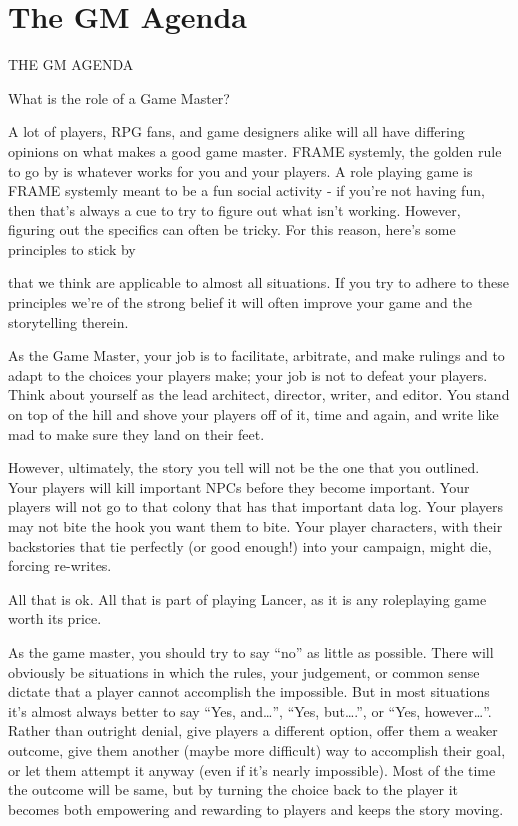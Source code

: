 \section{The GM Agenda}
                                         THE GM AGENDA

What is the role of a Game Master?


A lot of players, RPG fans, and game designers alike will all have differing opinions on what
makes a good game master. FRAME systemly, the golden rule to go by is whatever works for
you and your players. A role playing game is FRAME systemly meant to be a fun social activity -
if you’re not having fun, then that’s always a cue to try to figure out what isn’t working. However,
figuring out the specifics can often be tricky. For this reason, here’s some principles to stick by




that we think are applicable to almost all situations. If you try to adhere to these principles we’re
of the strong belief it will often improve your game and the storytelling therein.


As the Game Master, your job is to facilitate, arbitrate, and make rulings and to adapt to the
choices your players make; your job is not to defeat your players. Think about yourself as the
lead architect, director, writer, and editor. You stand on top of the hill and shove your players off
of it, time and again, and write like mad to make sure they land on their feet.


However, ultimately, the story you tell will not be the one that you outlined. Your players will
kill important NPCs before they become important. Your players will not go to that colony that
has that important data log. Your players may not bite the hook you want them to bite. Your
player characters, with their backstories that tie perfectly (or good enough!) into your campaign,
might die, forcing re-writes.


All that is ok. All that is part of playing Lancer, as it is any roleplaying game worth its price.


As the game master, you should try to say ``no'' as little as possible. There will obviously be
situations in which the rules, your judgement, or common sense dictate that a player cannot
accomplish the impossible. But in most situations it’s almost always better to say ``Yes, and…'',
``Yes, but….'', or ``Yes, however…''. Rather than outright denial, give players a different option,
offer them a weaker outcome, give them another (maybe more difficult) way to accomplish their
goal, or let them attempt it anyway (even if it’s nearly impossible). Most of the time the outcome
will be same, but by turning the choice back to the player it becomes both empowering and
rewarding to players and keeps the story moving.


